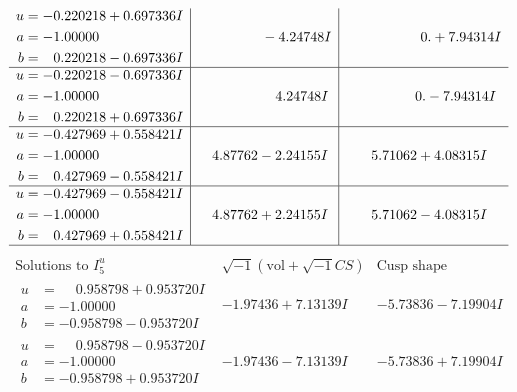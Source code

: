\documentclass[1p]{elsarticle_modified}
\theoremstyle{definition}
\newcommand{\I}{\sqrt{-1}}
\begin{document}
$$\begin{array}{c|c|c}
\begin{aligned}
u &= -0.220218 + 0.697336 I \\
a &= -1.00000\phantom{ +0.000000I} \\
b &= \phantom{-}0.220218 - 0.697336 I\end{aligned}
 & \phantom{-0.000000 } -4.24748 I & \phantom{-0.000000 -}0. + 7.94314 I \\ \hline\begin{aligned}
u &= -0.220218 - 0.697336 I \\
a &= -1.00000\phantom{ +0.000000I} \\
b &= \phantom{-}0.220218 + 0.697336 I\end{aligned}
 & \phantom{-0.000000 -}4.24748 I & \phantom{-0.000000 } 0. - 7.94314 I \\ \hline\begin{aligned}
u &= -0.427969 + 0.558421 I \\
a &= -1.00000\phantom{ +0.000000I} \\
b &= \phantom{-}0.427969 - 0.558421 I\end{aligned}
 & \phantom{-}4.87762 - 2.24155 I & \phantom{-}5.71062 + 4.08315 I \\ \hline\begin{aligned}
u &= -0.427969 - 0.558421 I \\
a &= -1.00000\phantom{ +0.000000I} \\
b &= \phantom{-}0.427969 + 0.558421 I\end{aligned}
 & \phantom{-}4.87762 + 2.24155 I & \phantom{-}5.71062 - 4.08315 I\\
 \hline 
 \end{array}$$\newpage$$\begin{array}{c|c|c}  
\text{Solutions to }I^u_{5}& \I (\text{vol} + \sqrt{-1}CS) & \text{Cusp shape}\\
 \hline 
\begin{aligned}
u &= \phantom{-}0.958798 + 0.953720 I \\
a &= -1.00000\phantom{ +0.000000I} \\
b &= -0.958798 - 0.953720 I\end{aligned}
 & -1.97436 + 7.13139 I & -5.73836 - 7.19904 I \\ \hline\begin{aligned}
u &= \phantom{-}0.958798 - 0.953720 I \\
a &= -1.00000\phantom{ +0.000000I} \\
b &= -0.958798 + 0.953720 I\end{aligned}
 & -1.97436 - 7.13139 I & -5.73836 + 7.19904 I \\ \hline\begin{aligned}

\end{aligned}
\end{array}$$
\end{document}

